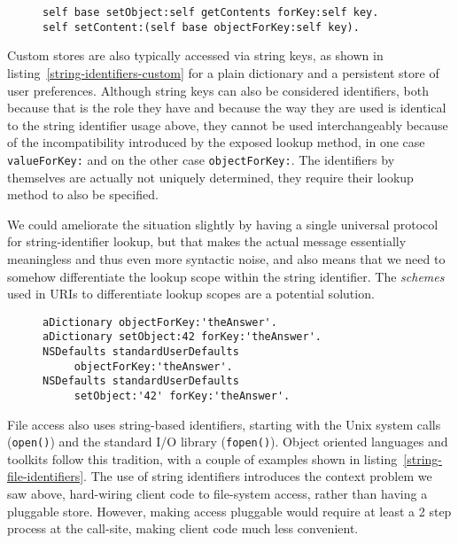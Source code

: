 \documentclass[preprint,authoryear]{acm_proc_article-sp}
\begin{document}
\begin{figure}[htbp]
\begin{lstlisting}[style=numbers,label=kvc-variable-string,caption=Parametrized access via KVC.]
self base setObject:self getContents forKey:self key.
self setContent:(self base objectForKey:self key).
\end{lstlisting}
\end{figure}

Custom stores are also typically accessed via string keys, as shown in listing~\ref{string-identifiers-custom} for
a plain dictionary and a persistent store of user preferences.  Although string keys can also be considered 
identifiers, both because that is the role they have and because the way they are used is identical to
the string identifier usage above, they cannot be used interchangeably because of the incompatibility
introduced by the exposed lookup method, in one case {\tt valueForKey:} and on the other case {\tt objectForKey:}.
The identifiers by themselves are actually not uniquely determined, they require their lookup method to also
be specified.


We could ameliorate the situation slightly by having a single universal protocol
for string-identifier lookup, but that makes the actual message essentially
meaningless and thus even more syntactic noise, and also means that we need
to somehow differentiate the lookup scope within the string identifier.   The
{\em schemes} used in URIs to differentiate lookup scopes are a potential
solution.


\begin{figure}[htbp]
\begin{lstlisting}[style=numbers,label=string-identifiers-custom,caption=String-based identifiers for custom storage.]
aDictionary objectForKey:'theAnswer'.
aDictionary setObject:42 forKey:'theAnswer'.
NSDefaults standardUserDefaults
	 objectForKey:'theAnswer'.
NSDefaults standardUserDefaults
	 setObject:'42' forKey:'theAnswer'.
\end{lstlisting}
\end{figure}


File access also uses string-based identifiers, starting with the Unix system calls ({\tt open()}) and the standard I/O library ({\tt fopen()}).
Object oriented languages and toolkits follow this tradition, with a couple of examples shown in listing~\ref{string-file-identifiers}.
The use of string identifiers introduces the context problem we saw above, hard-wiring client code to file-system access,
rather than having a pluggable store.   However, making access pluggable would require at least a 2 step process at the
call-site, making client code much less convenient.  
\end{document}
